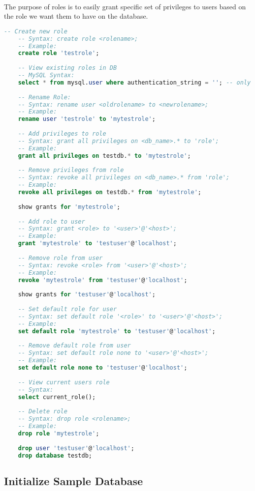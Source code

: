 \paragraph{} The purpose of roles is to easily grant specific set of privileges to users based on the role we want them to have on the database.
\begin{lstlisting}[language=SQL]
	-- Create new role
	-- Syntax: create role <rolename>;
	-- Example:
	create role 'testrole';
	
	-- View existing roles in DB
	-- MySQL Syntax:
	select * from mysql.user where authentication_string = ''; -- only roles should have empty authentication string
	
	-- Rename Role:
	-- Syntax: rename user <oldrolename> to <newrolename>;
	-- Example:
	rename user 'testrole' to 'mytestrole';
	
	-- Add privileges to role
	-- Syntax: grant all privileges on <db_name>.* to 'role';
	-- Example:
	grant all privileges on testdb.* to 'mytestrole';
	
	-- Remove privileges from role
	-- Syntax: revoke all privileges on <db_name>.* from 'role';
	-- Example:
	revoke all privileges on testdb.* from 'mytestrole';
	
	show grants for 'mytestrole';
	
	-- Add role to user
	-- Syntax: grant <role> to '<user>'@'<host>';
	-- Example:
	grant 'mytestrole' to 'testuser'@'localhost';
	
	-- Remove role from user
	-- Syntax: revoke <role> from '<user>'@'<host>';
	-- Example:
	revoke 'mytestrole' from 'testuser'@'localhost';
	
	show grants for 'testuser'@'localhost';
	
	-- Set default role for user
	-- Syntax: set default role '<role>' to '<user>'@'<host>';
	-- Example:
	set default role 'mytestrole' to 'testuser'@'localhost';
	
	-- Remove default role from user
	-- Syntax: set default role none to '<user>'@'<host>';
	-- Example:
	set default role none to 'testuser'@'localhost';
	
	-- View current users role
	-- Syntax:
	select current_role();
	
	-- Delete role
	-- Syntax: drop role <rolename>;
	-- Example:
	drop role 'mytestrole';
	
	drop user 'testuser'@'localhost';
	drop database testdb;
\end{lstlisting}
\subsection{Initialize Sample Database}
